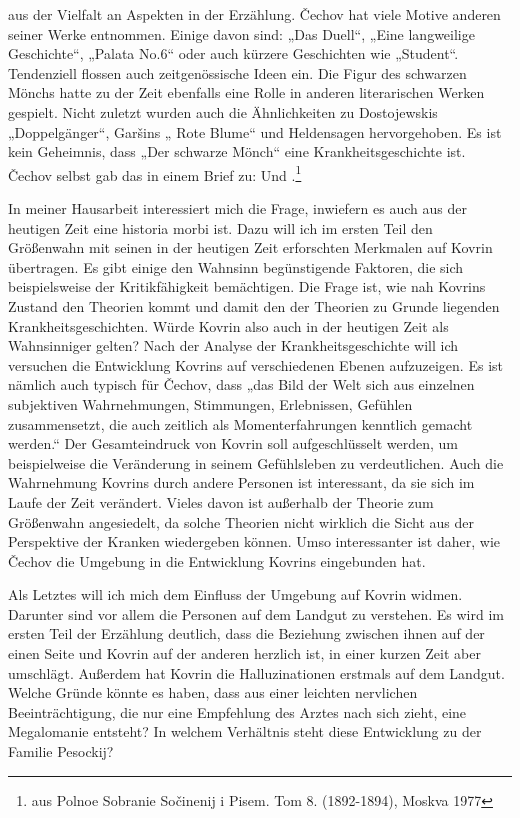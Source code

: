 \documentclass{../../sem_paper}
\begin{document}
aus der Vielfalt an Aspekten in der Erzählung.\autocite[108]{kluge}
Čechov hat viele Motive anderen seiner Werke
entnommen. Einige davon sind: „Das Duell“, „Eine langweilige Geschichte“, „Palata No.6“ oder
auch kürzere Geschichten wie „Student“.\autocite{woern} Tendenziell flossen auch zeitgenössische Ideen ein.\autocite{dudek} Die
Figur des schwarzen Mönchs hatte zu der Zeit ebenfalls eine Rolle in anderen literarischen Werken
gespielt.\autocite{winner} Nicht zuletzt wurden auch die Ähnlichkeiten zu Dostojewskis „Doppelgänger“\autocite{woell}, Garšins
„ Rote Blume“\autocite{freise97} und Heldensagen\autocite{senderovich} hervorgehoben.
Es ist kein Geheimnis, dass „Der schwarze Mönch“ eine Krankheitsgeschichte ist. Čechov selbst
gab das in einem Brief zu:  Und .\footnote{ aus
Polnoe Sobranie Sočinenij i Pisem. Tom 8. (1892-1894), Moskva 1977}

In meiner Hausarbeit interessiert mich die Frage, inwiefern es auch aus der heutigen Zeit eine
historia morbi ist. Dazu will ich im ersten Teil den Größenwahn mit seinen in der heutigen Zeit
erforschten Merkmalen auf Kovrin übertragen. Es gibt einige den Wahnsinn begünstigende
Faktoren, die sich beispielsweise der Kritikfähigkeit bemächtigen. Die Frage ist, wie nah Kovrins
Zustand den Theorien kommt und damit den der Theorien zu Grunde liegenden
Krankheitsgeschichten. Würde Kovrin also auch in der heutigen Zeit als Wahnsinniger gelten?
Nach der Analyse der Krankheitsgeschichte will ich versuchen die Entwicklung Kovrins auf
verschiedenen Ebenen aufzuzeigen. Es ist nämlich auch typisch für Čechov, dass „das Bild der Welt
sich aus einzelnen subjektiven Wahrnehmungen, Stimmungen, Erlebnissen, Gefühlen
zusammensetzt, die auch zeitlich als Momenterfahrungen kenntlich gemacht werden.“\autocite[83]{hielscher} Der
Gesamteindruck von Kovrin soll aufgeschlüsselt werden, um beispielweise die Veränderung in
seinem Gefühlsleben zu verdeutlichen. Auch die Wahrnehmung Kovrins durch andere Personen ist
interessant, da sie sich im Laufe der Zeit verändert. Vieles davon ist außerhalb der Theorie zum
Größenwahn angesiedelt, da solche Theorien nicht wirklich die Sicht aus der Perspektive der
Kranken wiedergeben können. Umso interessanter ist daher, wie Čechov die Umgebung in die
Entwicklung Kovrins eingebunden hat.

Als Letztes will ich mich dem Einfluss der Umgebung auf Kovrin widmen. Darunter sind vor allem
die Personen auf dem Landgut zu verstehen. Es wird im ersten Teil der Erzählung deutlich, dass die
Beziehung zwischen ihnen auf der einen Seite und Kovrin auf der anderen herzlich ist, in einer
kurzen Zeit aber umschlägt. Außerdem hat Kovrin die Halluzinationen erstmals auf dem Landgut.
Welche Gründe könnte es haben, dass aus einer leichten nervlichen Beeinträchtigung, die nur eine
Empfehlung des Arztes nach sich zieht, eine Megalomanie entsteht? In welchem Verhältnis steht
diese Entwicklung zu der Familie Pesockij?
\end{document}
